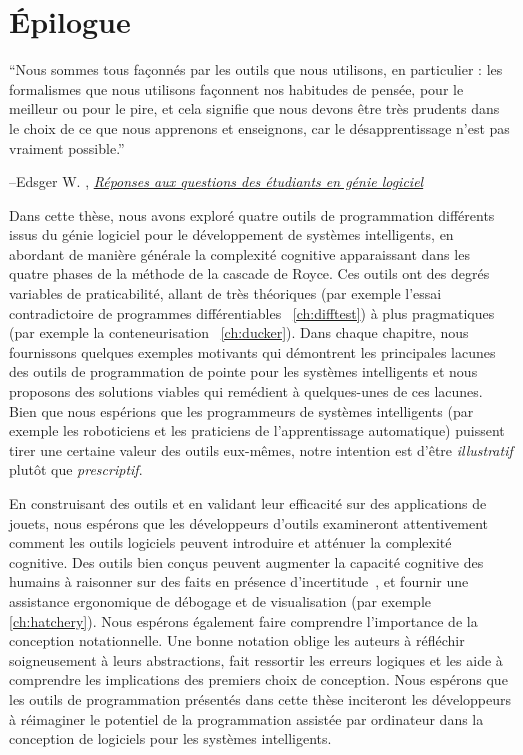 \chapter{Épilogue}\label{ch:conclusion}
\setlength{\epigraphwidth}{0.90\textwidth}
\epigraph{``Nous sommes tous façonnés par les outils que nous utilisons, en particulier : les formalismes que nous utilisons façonnent nos habitudes de pensée, pour le meilleur ou pour le pire, et cela signifie que nous devons être très prudents dans le choix de ce que nous apprenons et enseignons, car le désapprentissage n'est pas vraiment possible.''}{\begin{flushright}--Edsger W. \citet{dijkstra2000answers}, \href{https://www.cs.utexas.edu/~EWD/transcriptions/EWD13xx/EWD1305.html}{\textit{Réponses aux questions des étudiants en génie logiciel}}\end{flushright}}

Dans cette thèse, nous avons exploré quatre outils de programmation différents issus du génie logiciel pour le développement de systèmes intelligents, en abordant de manière générale la complexité cognitive apparaissant dans les quatre phases de la méthode de la cascade de Royce. Ces outils ont des degrés variables de praticabilité, allant de très théoriques (par exemple l'essai contradictoire de programmes différentiables ~\autoref{ch:difftest}) à plus pragmatiques (par exemple la conteneurisation ~\autoref{ch:ducker}). Dans chaque chapitre, nous fournissons quelques exemples motivants qui démontrent les principales lacunes des outils de programmation de pointe pour les systèmes intelligents et nous proposons des solutions viables qui remédient à quelques-unes de ces lacunes. Bien que nous espérions que les programmeurs de systèmes intelligents (par exemple les roboticiens et les praticiens de l'apprentissage automatique) puissent tirer une certaine valeur des outils eux-mêmes, notre intention est d'être \textit{illustratif} plutôt que \textit{prescriptif}.

En construisant des outils et en validant leur efficacité sur des applications de jouets, nous espérons que les développeurs d'outils examineront attentivement comment les outils logiciels peuvent introduire et atténuer la complexité cognitive. Des outils bien conçus peuvent augmenter la capacité cognitive des humains à raisonner sur des faits en présence d'incertitude~\citep{famelis2012partial}, et fournir une assistance ergonomique de débogage et de visualisation (par exemple \autoref{ch:hatchery}). Nous espérons également faire comprendre l'importance de la conception notationnelle. Une bonne notation oblige les auteurs à réfléchir soigneusement à leurs abstractions, fait ressortir les erreurs logiques et les aide à comprendre les implications des premiers choix de conception. Nous espérons que les outils de programmation présentés dans cette thèse inciteront les développeurs à réimaginer le potentiel de la programmation assistée par ordinateur dans la conception de logiciels pour les systèmes intelligents.

